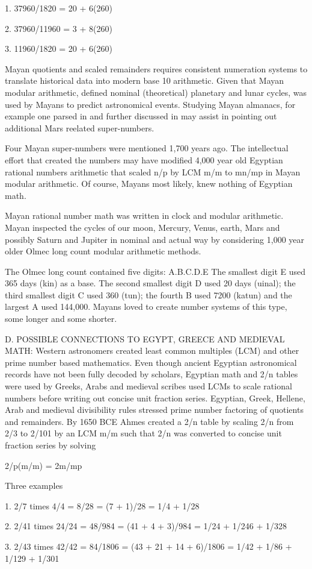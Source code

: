 \documentclass[12pt]{article}
\begin{document}
1. 37960/1820 = 20 + 6(260)

2. 37960/11960 = 3 + 8(260)

3. 11960/1820 = 20 + 6(260)

Mayan quotients and scaled remainders requires consistent numeration systems to translate historical data into modern base 10 arithmetic. Given that Mayan modular arithmetic, defined nominal (theoretical) planetary and lunar cycles, was used by Mayans to predict astronomical events. Studying Mayan almanacs, for example one parsed in  and further discussed in  may assist in pointing out additional Mars reelated super-numbers. 

Four Mayan super-numbers were mentioned 1,700 years ago. The intellectual effort that created the numbers may have modified 4,000 year old Egyptian rational numbers arithmetic that scaled n/p by LCM m/m to mn/mp in Mayan modular arithmetic. Of course, Mayans most likely, knew nothing of Egyptian math. 

Mayan rational number math was written in clock and modular arithmetic. Mayan inspected the cycles of our moon, Mercury, Venus, earth, Mars and possibly Saturn and Jupiter in nominal and actual way by considering 1,000 year older Olmec long count modular arithmetic methods.

The Olmec long count contained five digits: A.B.C.D.E The smallest digit E used 365 days (kin) as a base. The second smallest digit D used 20 days (uinal); the third smallest digit C used 360 (tun); the fourth B used 7200 (katun) and the largest A used 144,000. Mayans loved to create number systems of this type, some longer and some shorter.  

D. POSSIBLE CONNECTIONS TO EGYPT, GREECE AND MEDIEVAL MATH: Western astronomers created least common multiples (LCM) and other prime number based mathematics. Even though ancient Egyptian astronomical records have not been fully decoded by scholars, Egyptian math and 2/n tables were used by Greeks, Arabs and medieval scribes used LCMs to scale rational numbers before writing out concise unit fraction series. Egyptian, Greek, Hellene, Arab and medieval divisibility rules stressed prime number factoring of quotients and remainders. By 1650 BCE Ahmes created a 2/n table by scaling 2/n from 2/3 to 2/101 by an LCM m/m such that 2/n was converted to concise unit fraction series by solving 

2/p(m/m) = 2m/mp

Three examples

1. 2/7 times 4/4 = 8/28 = (7 + 1)/28 = 1/4 + 1/28

2. 2/41 times 24/24 = 48/984 = (41 + 4 + 3)/984 = 1/24 + 1/246 + 1/328

3. 2/43 times 42/42 = 84/1806 = (43 + 21 + 14 + 6)/1806 = 1/42 + 1/86 + 1/129 + 1/301



\end{document}
